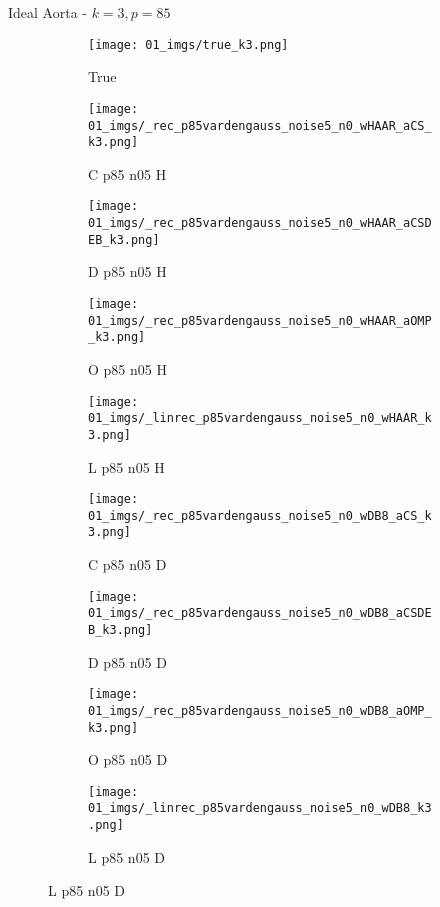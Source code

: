 \begin{frame}{Ideal Aorta - $k=3,p=85$}{}
\begin{figure}

\begin{subfigure}{0.1\textwidth}
\texttt{[image: 01\_imgs/true\_k3.png]}
\caption*{\Tiny True}
\end{subfigure}
\begin{subfigure}{0.1\textwidth}
\texttt{[image: 01\_imgs/\_rec\_p85vardengauss\_noise5\_n0\_wHAAR\_aCS\_k3.png]}
\caption*{\Tiny C p85 n05 H}
\end{subfigure}
\begin{subfigure}{0.1\textwidth}
\texttt{[image: 01\_imgs/\_rec\_p85vardengauss\_noise5\_n0\_wHAAR\_aCSDEB\_k3.png]}
\caption*{\Tiny D p85 n05 H}
\end{subfigure}
\begin{subfigure}{0.1\textwidth}
\texttt{[image: 01\_imgs/\_rec\_p85vardengauss\_noise5\_n0\_wHAAR\_aOMP\_k3.png]}
\caption*{\Tiny O p85 n05 H}
\end{subfigure}
\begin{subfigure}{0.1\textwidth}
\texttt{[image: 01\_imgs/\_linrec\_p85vardengauss\_noise5\_n0\_wHAAR\_k3.png]}
\caption*{\Tiny L p85 n05 H}
\end{subfigure}
\begin{subfigure}{0.1\textwidth}
\texttt{[image: 01\_imgs/\_rec\_p85vardengauss\_noise5\_n0\_wDB8\_aCS\_k3.png]}
\caption*{\Tiny C p85 n05 D}
\end{subfigure}
\begin{subfigure}{0.1\textwidth}
\texttt{[image: 01\_imgs/\_rec\_p85vardengauss\_noise5\_n0\_wDB8\_aCSDEB\_k3.png]}
\caption*{\Tiny D p85 n05 D}
\end{subfigure}
\begin{subfigure}{0.1\textwidth}
\texttt{[image: 01\_imgs/\_rec\_p85vardengauss\_noise5\_n0\_wDB8\_aOMP\_k3.png]}
\caption*{\Tiny O p85 n05 D}
\end{subfigure}
\begin{subfigure}{0.1\textwidth}
\texttt{[image: 01\_imgs/\_linrec\_p85vardengauss\_noise5\_n0\_wDB8\_k3.png]}
\caption*{\Tiny L p85 n05 D}
\end{subfigure}

\vspace{5pt}


\end{figure}
\end{frame}
